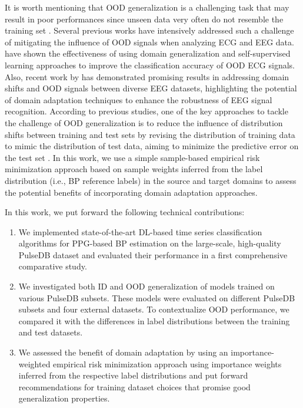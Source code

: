 It is worth mentioning that OOD generalization is a challenging task that may result in poor performances since unseen data very often do not resemble the training set \cite{hendrycks2017baseline, liang2018enhancing}. Several previous works have intensively addressed such a challenge of mitigating the influence of OOD signals when analyzing ECG and EEG data. \cite{ballas2022domain,soltanieh2023distribution} have shown the effectiveness of using domain generalization and self-supervised learning approaches to improve the classification accuracy of OOD ECG signals. Also, recent work by \cite{yang2022multimodal} has demonstrated promising results in addressing domain shifts and OOD signals between diverse EEG datasets, highlighting the potential of domain adaptation techniques to enhance the robustness of EEG signal recognition. According to previous studies, one of the key approaches to tackle the challenge of OOD generalization is to reduce the influence of distribution shifts between training and test sets by revising the distribution of training data to mimic the distribution of test data, aiming to minimize the predictive error on the test set \cite{ben2010theory,bickel2009discriminative}.
In this work, we use a simple sample-based empirical risk minimization approach based on sample weights inferred from the label distribution (i.e., BP reference labels) in the source and target domains to assess the potential benefits of incorporating domain adaptation approaches. 

In this work, we put forward the following technical contributions:


\begin{enumerate}

 


\item We implemented state-of-the-art DL-based time series classification algorithms for PPG-based BP estimation on the large-scale, high-quality PulseDB dataset and evaluated their performance in a first comprehensive comparative study. 

\item We investigated both ID and OOD generalization of models trained on various PulseDB subsets. These models were evaluated on different PulseDB subsets and four external datasets. To contextualize OOD performance, we compared it with the differences in label distributions between the training and test datasets.




\item We assessed the benefit of domain adaptation by using an importance-weighted empirical risk minimization approach using importance weights inferred from the respective label distributions and put forward recommendations for training dataset choices that promise good generalization properties.


\end{enumerate}